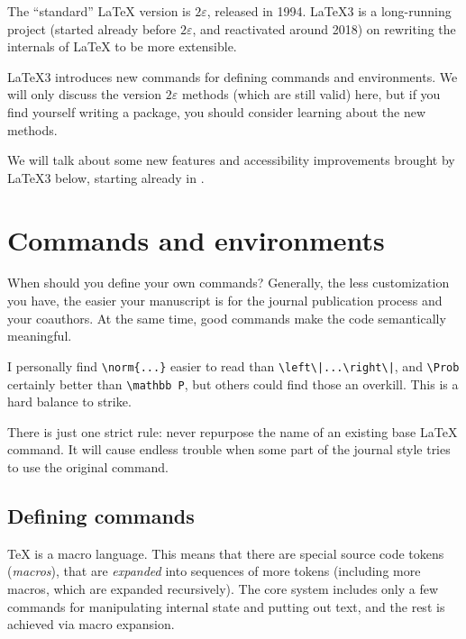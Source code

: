 \begin{latexthree}
The ``standard'' \LaTeX{} version is $2\varepsilon$, released in 1994.
\LaTeX3 is a long-running project (started already before $2\varepsilon$, and reactivated around 2018)
on rewriting the internals of \LaTeX{} to be more extensible.

\LaTeX3 introduces new commands for defining commands and environments.
We will only discuss the version $2\varepsilon$ methods (which are still valid) here,
but if you find yourself writing a package, you should consider learning about the new methods.

We will talk about some new features and accessibility improvements brought by \LaTeX3 below,
starting already in .
\end{latexthree}



%
%
%
\section{Commands and environments}

\begin{practices}
When should you define your own commands?
Generally, the less customization you have,
the easier your manuscript is for the journal publication process and your coauthors.
At the same time, good commands make the code semantically meaningful.

I personally find \verb&\norm{...}& easier to read than \verb&\left\|...\right\|&,
and \verb|\Prob| certainly better than \verb|\mathbb P|,
but others could find those an overkill.
This is a hard balance to strike.

There is just one strict rule:
never repurpose the name of an existing base \LaTeX{} command.
It will cause endless trouble when some part of the journal style tries to use the original command.
\end{practices}


\subsection{Defining commands}
\TeX{} is a macro language.
This means that there are special source code tokens (\emph{macros}),
that are \emph{expanded} into sequences of more tokens
(including more macros, which are expanded recursively).
The core system includes only a few commands for manipulating internal state and putting out text,
and the rest is achieved via macro expansion.


